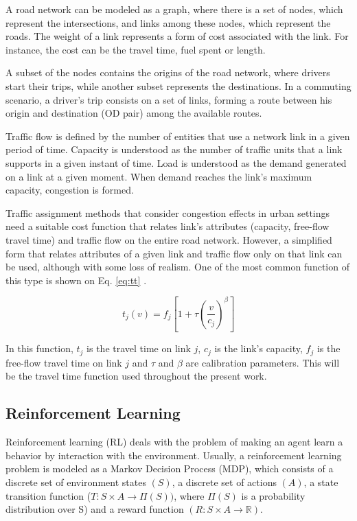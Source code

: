 \documentclass{RITA}
\newcommand{\travTime}{\ensuremath{t_j}} 	%
\newcommand{\fftt}{\ensuremath{f_j}} 		%
\newcommand{\linkCap}{\ensuremath{c_j}}		%
\newcommand{\veh}{\ensuremath{v}}		%
\begin{document}
A road network can be modeled as a graph, where there is a set of nodes, which represent the intersections, and links among these nodes, which represent the roads. The weight of a link represents a form of cost associated with the link. For instance, the cost can be the travel time, fuel spent or length.

A subset of the nodes contains the origins of the road network, where drivers start their trips, while another subset represents the destinations. In a commuting scenario, a driver's trip consists on a set of links, forming a route between his origin and destination (OD pair) among the available routes.

Traffic flow is defined by the number of entities that use a network link in a given period of time. Capacity is understood as the number of traffic units that a link supports in a given instant of time. Load is understood as the demand generated on a link at a given moment. When demand reaches the link's maximum capacity, congestion is formed.

Traffic assignment methods that consider congestion effects in urban settings need a suitable cost function that relates link's attributes (capacity, free-flow travel time) and traffic flow on the entire road network. However, a simplified form that relates attributes of a  given link and traffic flow only on that link can be used, although with some loss of realism. One of the most common function of this type is shown on Eq. \eqref{eq:tt} \cite{Ortuzar&Willumsen2001}.

\begin{equation}
\label{eq:tt}
\travTime(\veh) = \fftt[1 + \tau \left(\frac{\veh}{\linkCap}\right)^\beta]
\end{equation}

In this function, $\travTime$ is the travel time on link $j$, $\linkCap$ is the link's capacity, $\fftt$ is the free-flow travel time on link $j$ and $\tau$ and $\beta$ are calibration parameters. This will be the travel time function used throughout the present work.

\subsection{Reinforcement Learning}
\label{sec:rl}
Reinforcement learning (RL) deals with the problem of making an agent learn a behavior by interaction with the environment. Usually, a reinforcement learning problem is modeled as a Markov Decision Process (MDP), which consists of a discrete set of environment states $(S)$, a discrete set of actions $(A)$, a state transition function ($T: S \times A \to \Pi(S))$, where $\Pi(S)$ is a probability distribution over S) and a reward function $(R: S \times A \to \mathbb{R})$. %
\end{document}
